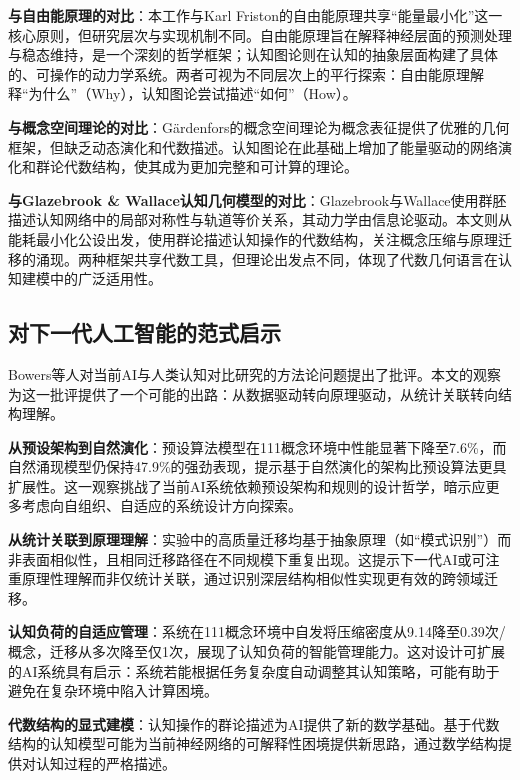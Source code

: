 \documentclass[12pt,a4paper]{article}
\begin{document}
\textbf{与自由能原理的对比}：本工作与Karl Friston的自由能原理共享“能量最小化”这一核心原则，但研究层次与实现机制不同。自由能原理旨在解释神经层面的预测处理与稳态维持，是一个深刻的哲学框架；认知图论则在认知的抽象层面构建了具体的、可操作的动力学系统。两者可视为不同层次上的平行探索：自由能原理解释“为什么”（Why），认知图论尝试描述“如何”（How）。

\textbf{与概念空间理论的对比}：Gärdenfors的概念空间理论为概念表征提供了优雅的几何框架，但缺乏动态演化和代数描述。认知图论在此基础上增加了能量驱动的网络演化和群论代数结构，使其成为更加完整和可计算的理论。

\textbf{与Glazebrook \& Wallace认知几何模型的对比}：Glazebrook与Wallace使用群胚描述认知网络中的局部对称性与轨道等价关系，其动力学由信息论驱动。本文则从能耗最小化公设出发，使用群论描述认知操作的代数结构，关注概念压缩与原理迁移的涌现。两种框架共享代数工具，但理论出发点不同，体现了代数几何语言在认知建模中的广泛适用性。

\subsection{对下一代人工智能的范式启示}

Bowers等人对当前AI与人类认知对比研究的方法论问题提出了批评。本文的观察为这一批评提供了一个可能的出路：从数据驱动转向原理驱动，从统计关联转向结构理解。

\textbf{从预设架构到自然演化}：预设算法模型在111概念环境中性能显著下降至7.6\%，而自然涌现模型仍保持47.9\%的强劲表现，提示基于自然演化的架构比预设算法更具扩展性。这一观察挑战了当前AI系统依赖预设架构和规则的设计哲学，暗示应更多考虑向自组织、自适应的系统设计方向探索。

\textbf{从统计关联到原理理解}：实验中的高质量迁移均基于抽象原理（如“模式识别”）而非表面相似性，且相同迁移路径在不同规模下重复出现。这提示下一代AI或可注重原理性理解而非仅统计关联，通过识别深层结构相似性实现更有效的跨领域迁移。

\textbf{认知负荷的自适应管理}：系统在111概念环境中自发将压缩密度从9.14降至0.39次/概念，迁移从多次降至仅1次，展现了认知负荷的智能管理能力。这对设计可扩展的AI系统具有启示：系统若能根据任务复杂度自动调整其认知策略，可能有助于避免在复杂环境中陷入计算困境。

\textbf{代数结构的显式建模}：认知操作的群论描述为AI提供了新的数学基础。基于代数结构的认知模型可能为当前神经网络的可解释性困境提供新思路，通过数学结构提供对认知过程的严格描述。

\end{document}
